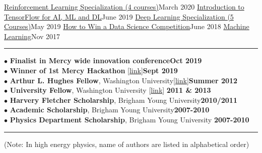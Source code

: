 \documentclass[10pt,letterpaper]{article}
\begin{document}
\headedsubsection
{\href{https://www.coursera.org/account/accomplishments/specialization/86SNN7EEXUL2}{Reinforcement Learning Specialization (4 courses)}}{March 2020}{}
\headedsubsection
{\href{https://www.coursera.org/account/accomplishments/certificate/KFLEJGRZMYQZ}{Introduction to TensorFlow for AI, ML and DL}}{June 2019}{}
\headedsubsection
{\href{https://www.coursera.org/account/accomplishments/specialization/P8F8U69WUCVD}{Deep Learning Specialization (5 Courses)}}{May 2019} {}
\headedsubsection
{\href{https://www.coursera.org/account/accomplishments/verify/WAQ4WS7BCBDS}{How to Win a Data Science Competition}}{June 2018}{}
\headedsubsection
{\href{https://www.coursera.org/account/accomplishments/certificate/R3Q26XAHTCHD}{Machine Learning}}{Nov 2017}{}

\hrule
{} 
$\bullet$ {\bf Finalist in Mercy wide innovation conference}\hfill{\bf Oct 2019}\\
$\bullet$ {\bf Winner of 1st Mercy Hackathon} [\href {https://www.linkedin.com/feed/update/urn:li:activity:6582628165401792512/}{link}]\hfill{\bf Sept 2019}\\
 $\bullet$ {\bf Arthur L. Hughes Fellow}, Washington University[\href{https://physics.wustl.edu/graduate#secondary}{link}]\hfill {\bf Summer 2012}\\
 $\bullet$ {\bf University Fellow}, Washington University [\href{https://physics.wustl.edu/graduate#secondary}{link}] \hfill {\bf 2011 \& 2013 }\\
 $\bullet$ {\bf Harvery Fletcher Scholarship}, Brigham Young University\hfill {\bf 2010/2011}\\
 $\bullet$ {\bf Academic Scholarship}, Brigham Young University\hfill{\bf 2007-2010}\\
 $\bullet$ {\bf Physics Department Scholarship}, Brigham Young University \hfill{\bf 2007-2010}\\

\hrule
{}
(Note: In high energy physics, name of authors are listed in alphabetical order)\\
\end{document}
